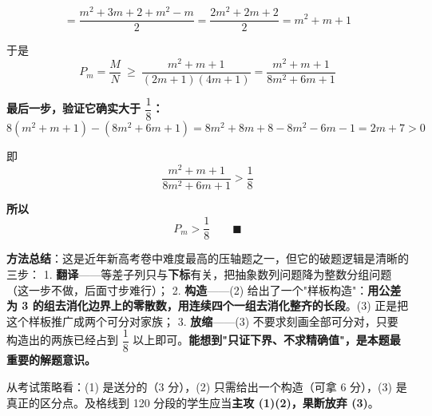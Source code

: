 \[=\frac{m^{2}+3m+2+m^{2}-m}2=\frac{2m^{2}+2m+2}2=m^{2}+m+1\]

于是
\[P_m=\frac{M}{N}\ \ge\ \frac{m^{2}+m+1}{(2m+1)(4m+1)}=\frac{m^{2}+m+1}{8m^{2}+6m+1}\]

\textbf{最后一步，验证它确实大于 $\dfrac18$：}
\[8\left(m^{2}+m+1\right)-\left(8m^{2}+6m+1\right)=8m^{2}+8m+8-8m^{2}-6m-1=2m+7>0\]

即
\[\frac{m^{2}+m+1}{8m^{2}+6m+1}>\frac18\]

\textbf{所以}
\[P_m>\frac18\qquad\blacksquare\]

\begin{gktip}
\textbf{方法总结}：这是近年新高考卷中难度最高的压轴题之一，但它的破题逻辑是清晰的三步：
1. \textbf{翻译}——等差子列只与\textbf{下标}有关，把抽象数列问题降为整数分组问题（这一步不做，后面寸步难行）；
2. \textbf{构造}——(2) 给出了一个"样板构造"：\textbf{用公差为 3 的组去消化边界上的零散数，用连续四个一组去消化整齐的长段}。(3) 正是把这个样板推广成两个可分对家族；
3. \textbf{放缩}——(3) 不要求刻画全部可分对，只要构造出的两族已经占到 $\dfrac18$ 以上即可。\textbf{能想到"只证下界、不求精确值"，是本题最重要的解题意识。}

从考试策略看：(1) 是送分的（3 分），(2) 只需给出一个构造（可拿 6 分），(3) 是真正的区分点。及格线到 120 分段的学生应当\textbf{主攻 (1)(2)，果断放弃 (3)}。
\end{gktip}
